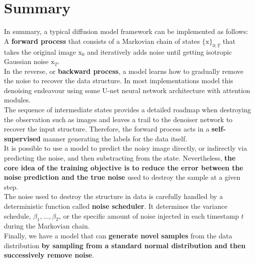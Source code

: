 \section{Summary}

In summary, a typical diffusion model framework can be implemented as follows:\\

\noindent A \textbf{forward process} that consists of a Markovian chain of states $\{\mathrm{x}\}_{0:T}$ that takes the original image $\mathrm{x}_0$ and iteratively adds noise until getting isotropic Gaussian noise $\mathrm{x}_{T}$. \\

\noindent In the reverse, or \textbf{backward process}, a model learns how to gradually remove the noise to recover the data structure. In most implementations model this denoising endeavour using some U-net neural network architecture with attention modules. \\

\noindent The sequence of intermediate states provides a detailed roadmap when destroying the observation such as images and leaves a trail to the denoiser network to recover the input structure. Therefore, the forward process acts in a \textbf{self-supervised} manner generating the labels for the data itself. \\

\noindent It is possible to use a model to predict the noisy image directly, or indirectly via predicting the noise, and then substracting from the state. Nevertheless, \textbf{the core idea of the training objective is to reduce the error between the noise prediction and the true noise} used to destroy the sample at a given step. \\

\noindent The noise used to destroy the structure in data is carefully handled by a deterministic function called \textbf{noise scheduler}. It determines the variance schedule, $\beta_{1}, \dots, \beta_{T}$, or the specific amount of noise injected in each timestamp $t$ during the Markovian chain. \\

\noindent Finally, we have a model that can \textbf{generate novel samples} from the data distribution \textbf{by sampling from a standard normal distribution and then 
successively remove noise}.
